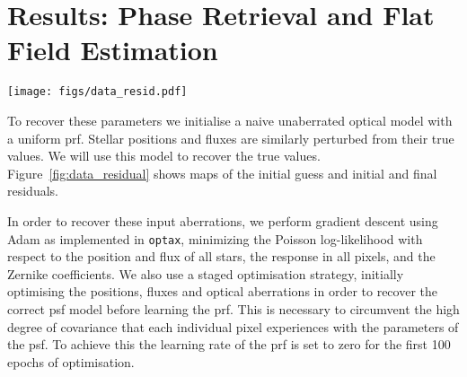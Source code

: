 \documentclass[]{spieman}
\newcommand\optax{\texttt{optax}\xspace}
\begin{document}
\section{Results: Phase Retrieval and Flat Field Estimation}
\label{sec:phaseretrieval}



\begin{figure*}
    \centering
    \texttt{[image: figs/data\_resid.pdf]}
    \caption{Left: single image of the full four that is used to create the full data set. This image has had both photon and detector noise applied. By eye it is clearly difficult to disentangle the astrophysical information. The large number of overlapping \ac{psf}s is chosen in order to spread light across the majority of the detector so that we encode the PRF information for as much of the detector as possible. Middle: the residual of this single image from the data and the initial uncalibrated model. Clearly these residuals are large, showing that there is a large amount of calibration required. Right: this same residual after the model has been optimised. The residual values are much smaller and at the noise floor. A small zoomed region is shown so that the individual pixel-level residuals can be seen.}
    \label{fig:data_residual}
\end{figure*}




To recover these parameters we initialise a naive unaberrated optical model with a uniform \ac{prf}. Stellar positions and fluxes are similarly perturbed from their true values. We will use this model to recover the true values. Figure~\ref{fig:data_residual} shows maps of the initial guess and initial and final residuals.

In order to recover these input aberrations, we perform gradient descent using Adam \cite{Kingma2014} as implemented in \optax \cite{optax2020github}, minimizing the Poisson log-likelihood with respect to the position and flux of all stars, the response in all pixels, and the Zernike coefficients. We also use a staged optimisation strategy, initially optimising the positions, fluxes and optical aberrations in order to recover the correct \ac{psf} model before learning the \ac{prf}. This is necessary to circumvent the high degree of covariance that each individual pixel experiences with the parameters of the \ac{psf}. To achieve this the learning rate of the \ac{prf} is set to zero for the first 100 epochs of optimisation.
\end{document}

